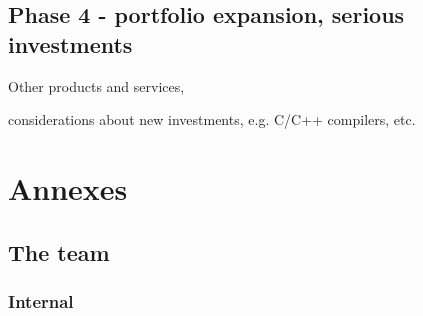 \documentclass[a4paper,twoside,15pt]{book}
\begin{document}
    \section{Phase 4 - portfolio expansion, serious investments}
        \begin{dinglist}{73}
            \item Other products and services,
            \item considerations about new investments, e.g. C/C++ compilers, etc.
        \end{dinglist}

\chapter{Annexes}
    \section{The team}
        \subsection{Internal}
\end{document}
